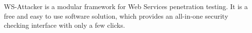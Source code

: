 WS-Attacker is a modular framework for Web Services penetration testing. It is a free and easy to use software solution, which provides an all-in-one security checking interface with only a few clicks.
